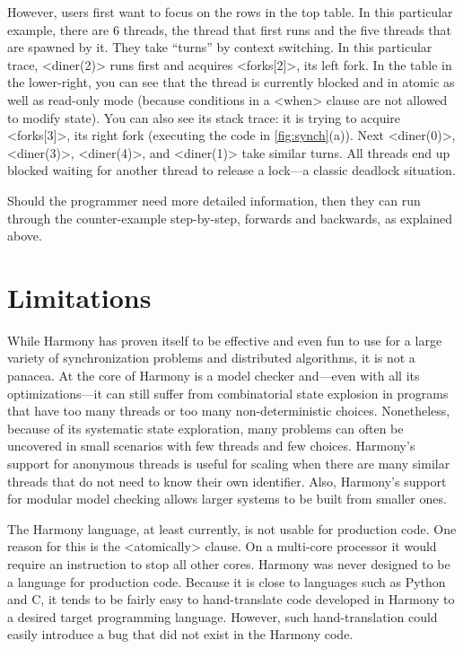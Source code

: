 \documentclass[twocolumn]{article}
\begin{document}
However, users first want to focus on the rows in the top table.
In this particular example, there are 6 threads, the thread that
first runs and the five threads that are spawned by it.  They take
``turns'' by context switching.  In this particular trace, <{diner(2)}>
runs first and acquires <{forks[2]}>, its left fork.  In the table
in the lower-right, you can see that the thread is currently blocked
and in atomic as well as read-only mode (because conditions in a <{when}>
clause are not allowed to modify state).  You can also see its stack
trace: it is trying to acquire <{forks[3]}>, its right fork (executing
the code in \autoref{fig:synch}(a)).  Next <{diner(0)}>, <{diner(3)}>,
<{diner(4)}>, and <{diner(1)}> take similar turns.  All threads end up
blocked waiting for another thread to release a lock---a classic
deadlock situation.

Should the programmer need more detailed information, then they can
run through the counter-example step-by-step, forwards and backwards,
as explained above.

\section{Limitations}

While Harmony has proven itself to be effective and even fun to use
for a large variety of synchronization problems and distributed
algorithms, it is not a panacea.  At the core of Harmony is a model
checker and---even with all its optimizations---it can still suffer
from combinatorial state explosion in programs that have too many
threads or too many non-deterministic choices.  Nonetheless, because
of its systematic state exploration, many problems can often be
uncovered in small scenarios with few threads and few choices.
Harmony's support for anonymous threads is useful for scaling when
there are many similar threads that do not need to know their own
identifier.  Also, Harmony's support for modular model checking
allows larger systems to be built from smaller ones.

The Harmony language, at least currently, is not usable for production
code.  One reason for this is the <{atomically}> clause.  On a multi-core
processor it would require an instruction to stop all other cores.
Harmony was never designed to be a language for production code.  Because
it is close to languages such as Python and C, it tends to be fairly
easy to hand-translate code developed in Harmony to a desired target
programming language.  However, such hand-translation could easily
introduce a bug that did not exist in the Harmony code.
\end{document}
